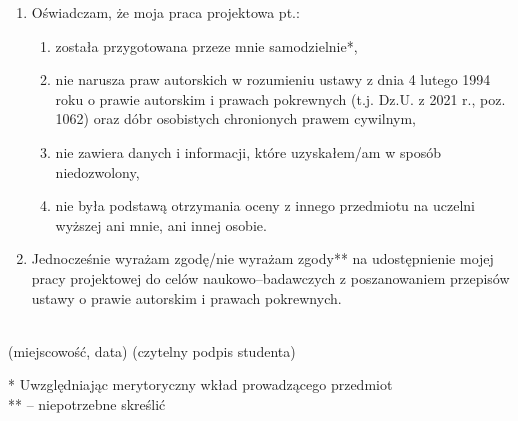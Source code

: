 \begin{enumerate}
    \item Oświadczam, że moja praca projektowa pt.: \@titlePL
          \begin{enumerate}[label=\arabic*)]
              \item została przygotowana przeze mnie samodzielnie*,
              \item nie narusza praw autorskich w rozumieniu ustawy z dnia 4 lutego 1994 roku o prawie autorskim i prawach pokrewnych (t.j. Dz.U. z 2021 r., poz. 1062) oraz dóbr osobistych chronionych prawem cywilnym,
              \item nie zawiera danych i informacji, które uzyskałem/am w sposób niedozwolony,
              \item nie była podstawą otrzymania oceny z innego przedmiotu na uczelni wyższej ani mnie, ani innej osobie.
          \end{enumerate}
    \item Jednocześnie wyrażam zgodę/nie wyrażam zgody** na udostępnienie mojej pracy projektowej do celów naukowo--badawczych z poszanowaniem przepisów ustawy o prawie autorskim i prawach pokrewnych.
\end{enumerate}


\vspace*{10mm}

\noindent
\underline{\hspace{6cm}} \hfill \underline{\hspace{6cm}} \\ %
\hspace*{13mm}(miejscowość, data)  \hspace*{60mm}(czytelny podpis studenta)
\vspace*{10mm}

\vfill
\noindent
* Uwzględniając merytoryczny wkład prowadzącego przedmiot \\
** -- niepotrzebne skreślić

